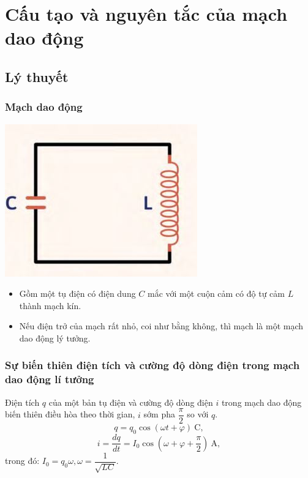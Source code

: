 \let\lesson\undefined
\newcommand{\lesson}{\phantomlesson{Bài 20: Mạch dao động}}
\chapter[Cấu tạo và nguyên tắc của mạch dao động]{Cấu tạo và nguyên tắc của mạch dao động}
\section{Lý thuyết}
\subsection {Mạch dao động}
\begin{center}
	\includegraphics[scale=0.5]{../figs/4-1-1.JPG}
\end{center}
\begin{itemize}
	\item Gồm một tụ điện có điện dung $C$ mắc với một cuộn cảm có độ tự cảm $L$ thành mạch kín.
	\item Nếu điện trở của mạch rất nhỏ, coi như bằng không, thì mạch là một mạch dao động lý tưởng.
\end{itemize}
\subsection{Sự biến thiên điện tích và cường độ dòng điện trong mạch dao động lí tưởng}
Điện tích $q$ của một bản tụ điện và cường độ dòng điện $i$ trong mạch dao động biến thiên điều hòa theo thời gian, $i$ sớm pha $\dfrac{\pi}{2} $ so với $q$.
\begin{equation}
	q=q_0\cos(\omega t +\varphi)\ \text{C}, 
\end{equation}
\begin{equation}
	i=\frac{dq}{dt}=I_0 \cos(\omega +\varphi+ \frac{\pi}{2})\ \text{A},
\end{equation}
trong đó: $I_0=q_0\omega, \omega =\dfrac{1}{\sqrt {LC}}$.
